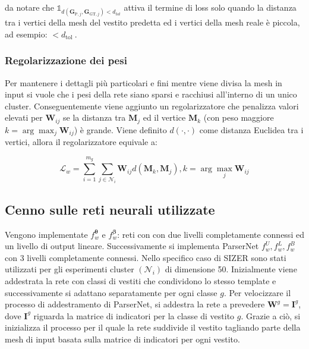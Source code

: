 da notare che $\mathbb{1}_{d\left(\mathbf{G}_{\mathrm{P}, j}, \boldsymbol{G}_{\mathrm{GT}, j}\right)<d_{t o l}}$ attiva il termine di loss solo quando la distanza tra i vertici della mesh del vestito predetta ed i vertici della mesh reale è piccola, ad esempio: $<d_{\text {tol }}$.





\medskip

\subsubsection{Regolarizzazione dei pesi}

\medskip

Per mantenere i dettagli più particolari e fini mentre viene divisa la mesh in input si vuole che i pesi della rete siano sparsi e racchiusi all'interno di un unico cluster. Conseguentemente viene aggiunto un regolarizzatore che penalizza valori elevati per $\mathbf{W}_{i j}$ se la distanza tra $\mathbf{M}_{j}$ ed il vertice $\mathbf{M}_{k}$ (con peso maggiore $k=\arg \max _{j} \mathbf{W}_{i j}$) è grande. Viene definito $d(\cdot, \cdot)$ come distanza Euclidea tra i vertici, allora il regolarizzatore equivale a:

\medskip

$$
\mathcal{L}_{w}=\sum_{i=1}^{m_{g}} \sum_{j \in \mathcal{N}_{i}} \mathbf{W}_{i j} d\left(\mathbf{M}_{k}, \mathbf{M}_{j}\right), k=\arg \max _{j} \mathbf{W}_{i j}
$$

\subsection{Cenno sulle reti neurali utilizzate}

\medskip

Vengono implementate $f_{w}^{\boldsymbol{\theta}}$ e $f_{w}^{\boldsymbol{\beta}}$: reti con con due livelli completamente connessi ed un livello di output lineare. Successivamente si implementa ParserNet $f_{w}^{U}, f_{w}^{L}, f_{w}^{B}$ con 3 livelli completamente connessi. Nello specifico caso di SIZER sono stati utilizzati per gli esperimenti cluster $\left(\mathcal{N}_{i}\right)$ di dimensione 50. 
Inizialmente viene addestrata la rete con classi di vestiti che condividono lo stesso template e successivamente si adattano separatamente per ogni classe $g$.
Per velocizzare il processo di addestramento di ParserNet, si addestra la rete a prevedere $\mathbf{W}^{g}=\mathbf{I}^{g}$, dove $\mathbf{I}^{g}$ riguarda la matrice di indicatori per la classe di vestito $g$.
Grazie a ciò, si inizializza il processo per il quale la rete suddivide il vestito tagliando parte della mesh di input basata sulla matrice di indicatori per ogni vestito.

